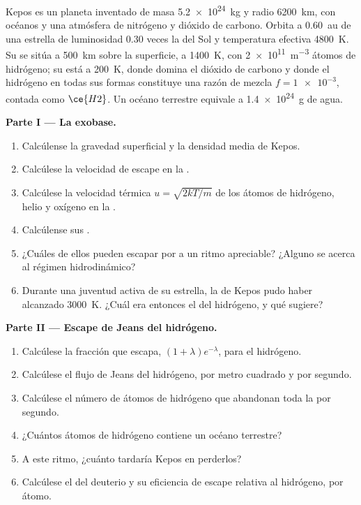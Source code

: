 \begin{problem}
\label{pb:b3:planetary-atmospheres:1}
Kepos es un planeta inventado de masa \qty{5.2e24}{kg} y radio
\qty{6200}{km}, con océanos y una atmósfera de nitrógeno y dióxido de
carbono. Orbita a \qty{0.60}{au} de una estrella de luminosidad 0.30 veces la
del Sol y temperatura efectiva \qty{4800}{K}. Su  se sitúa
a \qty{500}{km} sobre la superficie, a \qty{1400}{K}, con
\qty{2e11}{m^{-3}} átomos de hidrógeno; su  está a \qty{200}{K},
donde domina el dióxido de carbono y donde el hidrógeno en todas sus formas
constituye una razón de mezcla $f = \num{1e-3}$, contada como $\ce{H2}$. Un océano terrestre equivale a
\qty{1.4e24}{g} de agua.

\medskip\noindent\textbf{Parte I --- La exobase.}
\begin{enumerate}
\item Calcúlense la gravedad superficial y la densidad media de Kepos.
\item Calcúlese la velocidad de escape en la .
\item Calcúlese la velocidad térmica $u = \sqrt{2kT/m}$ de los átomos de hidrógeno, helio y
  oxígeno en la .
\item Calcúlense sus .
\item ¿Cuáles de ellos pueden escapar por  a un ritmo apreciable?
  ¿Alguno se acerca al régimen hidrodinámico?
\item Durante una juventud activa de su estrella, la  de Kepos pudo haber
  alcanzado \qty{3000}{K}. ¿Cuál era entonces el  del hidrógeno,
  y qué sugiere?
\end{enumerate}

\medskip\noindent\textbf{Parte II --- Escape de Jeans del hidrógeno.}
\begin{enumerate}[resume]
\item Calcúlese la fracción que escapa, $(1 + \lambda)e^{-\lambda}$, para
  el hidrógeno.
\item Calcúlese el flujo de Jeans del hidrógeno, por metro cuadrado y por segundo.
\item Calcúlese el número de átomos de hidrógeno que abandonan toda la 
  por segundo.
\item ¿Cuántos átomos de hidrógeno contiene un océano terrestre?
\item A este ritmo, ¿cuánto tardaría Kepos en perderlos?
\item Calcúlese el  del deuterio y su eficiencia de escape
  relativa al hidrógeno, por átomo.
\end{enumerate}


\end{problem}
